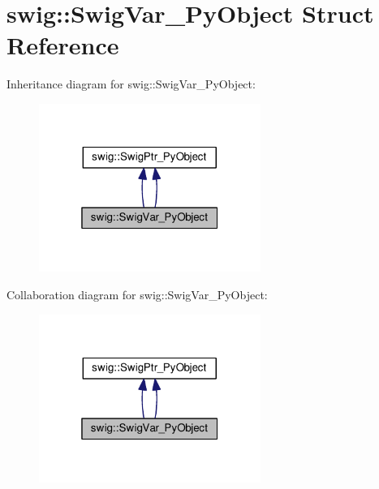 \hypertarget{structswig_1_1SwigVar__PyObject}{}\section{swig\+:\+:Swig\+Var\+\_\+\+Py\+Object Struct Reference}
\label{structswig_1_1SwigVar__PyObject}


Inheritance diagram for swig\+:\+:Swig\+Var\+\_\+\+Py\+Object\+:
\nopagebreak
\begin{figure}[H]
\begin{center}
\leavevmode
\includegraphics[width=205pt]{structswig_1_1SwigVar__PyObject__inherit__graph}
\end{center}
\end{figure}


Collaboration diagram for swig\+:\+:Swig\+Var\+\_\+\+Py\+Object\+:
\nopagebreak
\begin{figure}[H]
\begin{center}
\leavevmode
\includegraphics[width=205pt]{structswig_1_1SwigVar__PyObject__coll__graph}
\end{center}
\end{figure}
